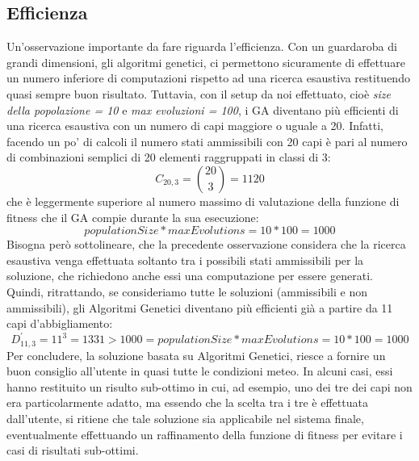 \documentclass[a4paper, 11pt, oneside]{report}
\begin{document}
            \subsection{Efficienza}\label{subsec:efficienza}
            Un'osservazione importante da fare riguarda l'efficienza.
            Con un guardaroba di grandi dimensioni, gli algoritmi genetici,
            ci permettono sicuramente di effettuare un numero inferiore di computazioni rispetto ad una ricerca esaustiva
            restituendo quasi sempre buon risultato.
            Tuttavia, con il setup da noi effettuato, cioè \emph{size della popolazione = 10} e
            \emph{max evoluzioni = 100}, i GA diventano più efficienti di una ricerca esaustiva con un numero di capi
            maggiore o uguale a 20.
            Infatti, facendo un po' di calcoli il numero stati ammissibili con 20 capi è pari al numero di combinazioni semplici
            di 20 elementi raggruppati in classi di 3:
            \begin{equation*}
                C_{20,3}=\binom{20}{3}= 1120
            \end{equation*}
            che è leggermente superiore al numero massimo di valutazione della funzione di fitness che il GA compie durante la sua esecuzione:
            \begin{equation*}
                populationSize * maxEvolutions = 10 * 100 = 1000
            \end{equation*}
            Bisogna però sottolineare, che la precedente osservazione considera che la ricerca esaustiva venga effettuata soltanto
            tra i possibili stati ammissibili per la soluzione, che richiedono anche essi una computazione per essere generati.
            Quindi, ritrattando, se consideriamo tutte le soluzioni (ammissibili e non ammissibili), gli Algoritmi Genetici diventano più efficienti già a partire da
            11 capi d'abbigliamento:
            \begin{equation*}
                D_{11,3}^{'}=11^3 = 1331  > 1000 = populationSize * maxEvolutions = 10 * 100 = 1000
            \end{equation*}
            Per concludere, la soluzione basata su Algoritmi Genetici, riesce a fornire un buon consiglio all'utente
            in quasi tutte le condizioni meteo.
            In alcuni casi, essi hanno restituito un risulto sub-ottimo in cui, ad esempio, uno dei tre dei capi non era
            particolarmente adatto, ma essendo che la scelta tra i tre è effettuata dall'utente, si ritiene che tale soluzione
            sia applicabile nel sistema finale, eventualmente effettuando un raffinamento della funzione di fitness per
            evitare i casi di risultati sub-ottimi.
\end{document}
